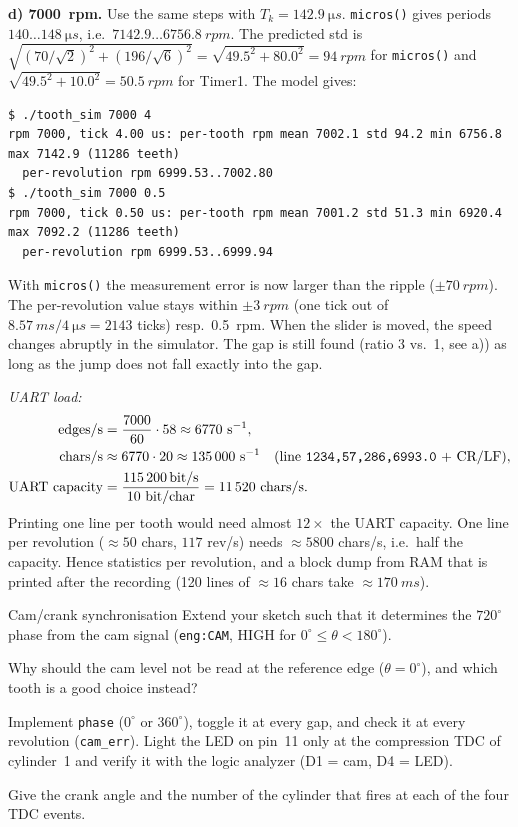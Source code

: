 \begin{solution}
\textbf{d) \SI{7000}{rpm}.} Use the same steps with $T_k=\SI{142.9}{\micro s}$.
\texttt{micros()} gives periods $140\dots\SI{148}{\micro s}$, i.e.\
$7142.9\dots\SI{6756.8}{rpm}$. The predicted std is
$\sqrt{(70/\sqrt2)^2+(196/\sqrt6)^2}=\sqrt{49.5^2+80.0^2}=\SI{94}{rpm}$
for \texttt{micros()} and $\sqrt{49.5^2+10.0^2}=\SI{50.5}{rpm}$ for Timer1. The model gives:
\begin{lstlisting}[style=shell,numbers=none]
$ ./tooth_sim 7000 4
rpm 7000, tick 4.00 us: per-tooth rpm mean 7002.1 std 94.2 min 6756.8 max 7142.9 (11286 teeth)
  per-revolution rpm 6999.53..7002.80
$ ./tooth_sim 7000 0.5
rpm 7000, tick 0.50 us: per-tooth rpm mean 7001.2 std 51.3 min 6920.4 max 7092.2 (11286 teeth)
  per-revolution rpm 6999.53..6999.94
\end{lstlisting}
With \texttt{micros()} the measurement error is now larger than the ripple
($\pm\SI{70}{rpm}$). The per-revolution value stays within $\pm\SI{3}{rpm}$
(one tick out of $\SI{8.57}{ms}/\SI{4}{\micro s}=2143$ ticks) resp.\
\SI{0.5}{rpm}. When the slider is moved, the speed changes abruptly in the
simulator. The gap is still found (ratio 3 vs.\ 1, see a)) as long as the jump
does not fall exactly into the gap.

\emph{UART load:}
\begin{align*}
  \text{edges/s} &= \frac{7000}{60}\cdot58 \approx 6770\ \text{s}^{-1},\\
  \text{chars/s} &\approx 6770\cdot20 \approx 135\,000\ \text{s}^{-1}
    \quad(\text{line \texttt{1234,57,286,6993.0} + CR/LF}),\\
  \text{UART capacity} &= \frac{\SI{115200}{bit/s}}{10\ \text{bit/char}}
    = 11\,520\ \text{chars/s}.
\end{align*}
Printing one line per tooth would need almost $12\times$ the UART capacity.
One line per revolution ($\approx50$ chars, $117$ rev/s) needs
$\approx5800$ chars/s, i.e.\ half the capacity. Hence statistics per
revolution, and a block dump from RAM that is printed after the recording
(120 lines of $\approx16$ chars take $\approx\SI{170}{ms}$).
\end{solution}

\begin{exercise}{Cam/crank synchronisation}{\Challenge}
Extend your sketch such that it determines the $720^\circ$ phase from the cam
signal (\texttt{eng:CAM}, HIGH for $0^\circ\le\theta<180^\circ$).
\begin{tasks}
  \item Why should the cam level not be read at the reference edge
    ($\theta=0^\circ$), and which tooth is a good choice instead?
  \item Implement \texttt{phase} ($0^\circ$ or $360^\circ$), toggle it at every
    gap, and check it at every revolution (\texttt{cam\_err}). Light the LED on
    pin~11 only at the compression TDC of cylinder~1 and verify it with the
    logic analyzer (D1 = cam, D4 = LED).
  \item Give the crank angle and the number of the cylinder that fires at each of
    the four TDC events.
\end{tasks}
\end{exercise}

